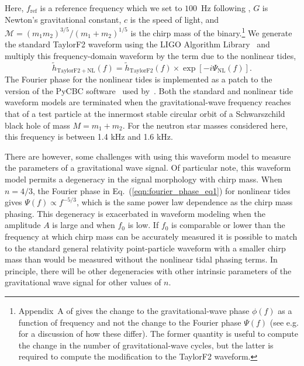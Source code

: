 Here, $f_\mathrm{ref}$ is a reference frequency which we set to $100$~Hz following \cite{Essick:2016tkn}, $G$ is Newton's gravitational constant, $c$ is the speed of light, and $\mathcal{M} = (m_1 m_2)^{3/5}/(m_1+m_2)^{1/5}$ is the chirp mass of the binary.\footnote{Appendix~A of \cite{Essick:2016tkn} gives the change to the gravitational-wave phase $\phi(f)$ as a function of frequency and not the change to the Fourier phase $\Psi(f)$ (see e.g. \cite{Lindblom:2008cm} for a discussion of how these differ). The former quantity is useful to compute the change in the number of gravitational-wave cycles, but the latter is required to compute the modification to the TaylorF2 waveform.} We generate the standard TaylorF2 waveform using the LIGO Algorithm Library~\citep{lal} and multiply this frequency-domain waveform by the term due to the nonlinear tides,
\begin{equation}
\tilde{h}_\mathrm{TaylorF2+NL}(f) = \tilde{h}_\mathrm{TaylorF2}(f) \times \exp[-i \Psi_\mathrm{NL}(f) ].
\end{equation}
The Fourier phase for the nonlinear tides is implemented as a patch to the version of the PyCBC software~\citep{alex_nitz_2018_1208115} used by~\cite{de2018tidal}. Both the standard and nonlinear tide waveform models are terminated when the gravitational-wave frequency reaches that of a test particle at the innermost stable circular orbit of a Schwarszchild black hole of mass $M = m_1 + m_2$. For the neutron star masses considered here, this frequency is between 1.4 kHz and 1.6 kHz.

There are however, some challenges with using this waveform model to measure the parameters of a gravitational wave signal. Of particular note, this waveform model permits a degeneracy in the signal morphology with chirp mass. When $n = 4/3$, the Fourier phase in Eq.~(\ref{eqn:fourier_phase_eq1}) for nonlinear tides gives $\Psi(f) \propto f^{-5/3}$, which is the same power law dependence as the chirp mass phasing. This degeneracy is exacerbated in waveform modeling when the amplitude $A$ is large and when $f_0$ is low. If $f_0$ is comparable or lower than the frequency at which chirp mass can be accurately measured it is possible to match to the standard general relativity point-particle waveform with a smaller chirp mass than would be measured without the nonlinear tidal phasing terms. In principle, there will be other degeneracies with other intrinsic parameters of the gravitational wave signal for other values of $n$.

